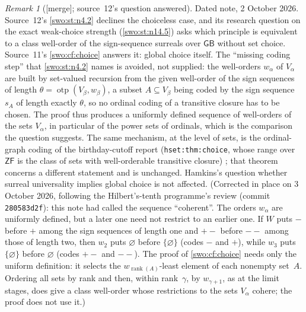 \documentclass[11pt]{article}
\theoremstyle{definition}
\theoremstyle{remark}
\newtheorem{remark}[remark]{Remark}
\newcommand{\otp}{\operatorname{otp}}
\newcommand{\rk}{\operatorname{rank}}
\newcommand{\GB}{\mathsf{GB}}
\newcommand{\ZF}{\mathsf{ZF}}
\newcommand{\code}[1]{\texttt{\small #1}}
\newcommand{\merge}{\textsf{[merge]}}
\begin{document}
\begin{remark}[\merge; source~12's question answered]\label{swo:rem:answered-choice}
Dated note, 2 October 2026. Source~12's \cref{swo:st:n4.2} declines the
choiceless case, and its research question on the exact weak-choice strength
(\cref{swo:st:n14.5}) asks which principle is equivalent to a class well-order
of the sign-sequence surreals over $\GB$ without set choice. Source~11's
\cref{swo:cf:choice} answers it: global choice itself. The ``missing coding
step'' that \cref{swo:st:n4.2} names is avoided, not supplied: the well-orders
$w_\alpha$ of $V_\alpha$ are built by set-valued recursion from the given
well-order of the sign sequences of length $\theta=\otp(V_\beta,w_\beta)$, a
subset $A\subseteq V_\beta$ being coded by the sign sequence $s_A$ of length
exactly $\theta$, so no ordinal coding of a transitive closure has to be
chosen. The proof thus produces a uniformly defined sequence of well-orders of the sets
$V_\alpha$, in particular of the power sets of ordinals, which is the
comparison the question suggests. The same mechanism, at the level of
sets, is the ordinal-graph coding of the birthday-cutoff report
(\code{hset:thm:choice}, whose range over $\ZF$ is the class of sets with
well-orderable transitive closure) \cite{ProveItHset}; that theorem concerns
a different statement and is unchanged. Hamkins's question whether surreal
universality implies global choice \cite{HamkinsUnivChoice} is not affected.
(Corrected in place on 3 October 2026, following the Hilbert's-tenth
programme's review
(commit \code{280583d2f}): this note had called the sequence
``coherent''. The orders $w_\alpha$ are uniformly defined, but a later one
need not restrict to an earlier one. If $W$ puts $-$ before $+$ among the
sign sequences of length one and $+-$ before $--$ among those of length two,
then $w_2$ puts $\varnothing$ before $\{\varnothing\}$ (codes $-$ and $+$),
while $w_3$ puts $\{\varnothing\}$ before $\varnothing$ (codes $+-$ and
$--$). The proof of \cref{swo:cf:choice} needs only the uniform definition:
it selects the $w_{\rk(A)}$-least element of each nonempty set~$A$.
Ordering all sets by rank and then, within rank~$\gamma$, by
$w_{\gamma+1}$, as at the limit stages, does give a class well-order whose
restrictions to the sets $V_\alpha$ cohere; the proof does not use it.)
\end{remark}

\end{document}

